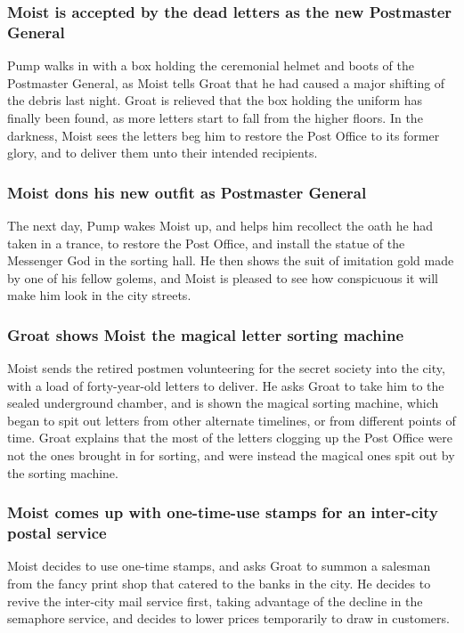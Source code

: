 \subsubsection{\Gls{Moist} is accepted by the dead letters as the new Postmaster General}
\Gls{Pump} walks in with a box holding the ceremonial helmet and boots of the Postmaster General,
as \Gls{Moist} tells \Gls{Groat} that he had caused a major shifting of the debris last night.
\Gls{Groat} is relieved that the box holding the uniform has finally been found, as more letters
start to fall from the higher floors. In the darkness, \Gls{Moist} sees the letters beg him to
restore the Post Office to its former glory, and to deliver them unto their intended recipients.

\subsubsection{\Gls{Moist} dons his new outfit as Postmaster General}
The next day, \Gls{Pump} wakes \Gls{Moist} up, and helps him recollect the oath he had taken in
a trance, to restore the Post Office, and install the statue of the Messenger God in the sorting
hall. He then shows the suit of imitation gold made by one of his fellow golems, and \Gls{Moist}
is pleased to see how conspicuous it will make him look in the city streets.

\subsubsection{\Gls{Groat} shows \Gls{Moist} the magical letter sorting machine}
\Gls{Moist} sends the retired postmen volunteering for the secret society into the city, with a load
of forty-year-old letters to deliver. He asks \Gls{Groat} to take him to the sealed underground
chamber, and is shown the magical sorting machine, which began to spit out letters from other
alternate timelines, or from different points of time. \Gls{Groat} explains that the most of the
letters clogging up the Post Office were not the ones brought in for sorting, and were instead the
magical ones spit out by the sorting machine.

\subsubsection{\Gls{Moist} comes up with one-time-use stamps for an inter-city postal service}
\Gls{Moist} decides to use one-time stamps, and asks \Gls{Groat} to summon a salesman from the
fancy print shop that catered to the banks in the city. He decides to revive the inter-city mail
service first, taking advantage of the decline in the semaphore service, and decides to lower prices
temporarily to draw in customers.

